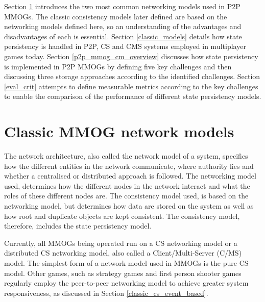 \documentclass[10pt,a4paper,journal,cspaper,compsoc]{IEEEtran}
\begin{document}
Section \ref{classic_network_models} introduces the two most common networking models used in P2P MMOGs. The classic consistency models later defined
are based on the networking models defined here, so an understanding of the advantages and disadvantages of each is essential.
%
Section \ref{classic_models} details how state persistency is handled in P2P, \ac{CS} and \ac{CMS} systems employed in multiplayer games today.
%
Section \ref{p2p_mmog_cm_overview} discusses how state persistency is implemented in P2P MMOGs by defining five key challenges and then discussing
three storage approaches according to the identified challenges.
%
Section \ref{eval_crit} attempts to define measurable metrics according to the key challenges to enable the comparison of the performance of
different state persistency models.


\section{Classic MMOG network models}
\label{classic_network_models}

The network architecture, also called the network model of a system, specifies how the different entities in the network communicate, where authority
lies and whether a centralised or distributed approach is followed. The networking model used, determines how the different nodes in the network
interact and what the roles of these different nodes are. The consistency model used, is based on the networking model, but determines how data are
stored on the system as well as how root and duplicate objects are kept consistent. The consistency model, therefore, includes the state persistency
model.

Currently, all MMOGs being operated run on a \ac{CS} networking model or a distributed \ac{CS} networking model, also called a Client/Multi-Server
(C/MS) model. The simplest form of a network model used in MMOGs is the pure \ac{CS} model. Other games, such as strategy games and first person
shooter games regularly employ the peer-to-peer networking model to achieve greater system responsiveness, as discussed in Section
\ref{classic_cs_event_based}.
\end{document}
